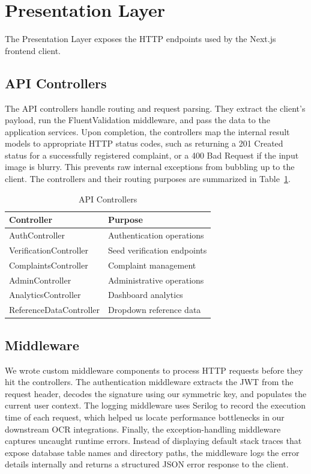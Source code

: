 \section{Presentation Layer}
\label{sec:presentation-layer}

The Presentation Layer exposes the HTTP endpoints used by the Next.js frontend client.

\subsection{API Controllers}
The API controllers handle routing and request parsing. They extract the client's payload, run the FluentValidation middleware, and pass the data to the application services. Upon completion, the controllers map the internal result models to appropriate HTTP status codes, such as returning a 201 Created status for a successfully registered complaint, or a 400 Bad Request if the input image is blurry. This prevents raw internal exceptions from bubbling up to the client. The controllers and their routing purposes are summarized in Table~\ref{tab:api-controllers}.

\begin{table}[htbp]
\centering
\caption{API Controllers}
\label{tab:api-controllers}
\small
\renewcommand{\arraystretch}{1.1}

\begin{tabularx}{\textwidth}{|p{5.2cm}|X|}
\hline
\textbf{Controller} & \textbf{Purpose} \\
\hline
AuthController & Authentication operations \\
\hline
VerificationController & Seed verification endpoints \\
\hline
ComplaintsController & Complaint management \\
\hline
AdminController & Administrative operations \\
\hline
AnalyticsController & Dashboard analytics \\
\hline
ReferenceDataController & Dropdown reference data \\
\hline
\end{tabularx}
\end{table}

\subsection{Middleware}
We wrote custom middleware components to process HTTP requests before they hit the controllers. The authentication middleware extracts the JWT from the request header, decodes the signature using our symmetric key, and populates the current user context. The logging middleware uses Serilog to record the execution time of each request, which helped us locate performance bottlenecks in our downstream OCR integrations. Finally, the exception-handling middleware captures uncaught runtime errors. Instead of displaying default stack traces that expose database table names and directory paths, the middleware logs the error details internally and returns a structured JSON error response to the client.


